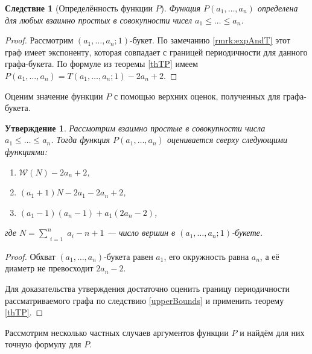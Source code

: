 \documentclass[12pt]{article}
\newtheorem{proposition}[theorem]{Утверждение}
\newtheorem{corollary}[theorem]{Следствие}
\theoremstyle{definition}
\begin{document}
\begin{corollary}[Определённость функции $P$]
Функция $P(a_1, \dots, a_n)$ определена для любых взаимно простых в совокупности чисел $a_1 \le \dots \le a_n$.
\end{corollary}
\begin{proof}
Рассмотрим $(a_1, \dots, a_n; 1)$-букет. По замечанию \ref{rmrk:expAndT} этот граф имеет экспоненту, которая совпадает с границей периодичности для данного графа-букета. По формуле из теоремы \ref{thTP} имеем $P(a_1, \dots, a_n) = T(a_1, \dots, a_n; 1) - 2a_n + 2$.
\end{proof}

Оценим значение функции $P$ с помощью верхних оценок, полученных для графа-букета.

\begin{proposition}
\label{upperBoundsP}
Рассмотрим взаимно простые в совокупности числа $a_1 \le \dots \le a_n$. Тогда функция $P(a_1, \dots, a_n)$ оценивается сверху следующими функциями:
\begin{enumerate}
\item $\mathcal{W}(N) - 2a_n + 2$,
\item $(a_1 + 1)N - 2a_1 - 2a_n + 2$,
\item $(a_1 - 1)(a_n - 1) + a_1(2a_n - 2)$,
\end{enumerate}
где $N = \sum\limits_{\substack{i=1}}^n a_i - n + 1$ --- число вершин в $(a_1, \dots, a_n; 1)$-букете.
\end{proposition}
\begin{proof}
Обхват $(a_1, \dots, a_n)$-букета равен $a_1$, его окружность равна $a_n$, а её диаметр не превосходит $2a_n - 2$.

Для доказательства утверждения достаточно оценить границу периодичности рассматриваемого графа по следствию \ref{upperBounds} и применить теорему \ref{thTP}.
\end{proof}

Рассмотрим несколько частных случаев аргументов функции $P$ и найдём для них точную формулу для $P$.
\end{document}
